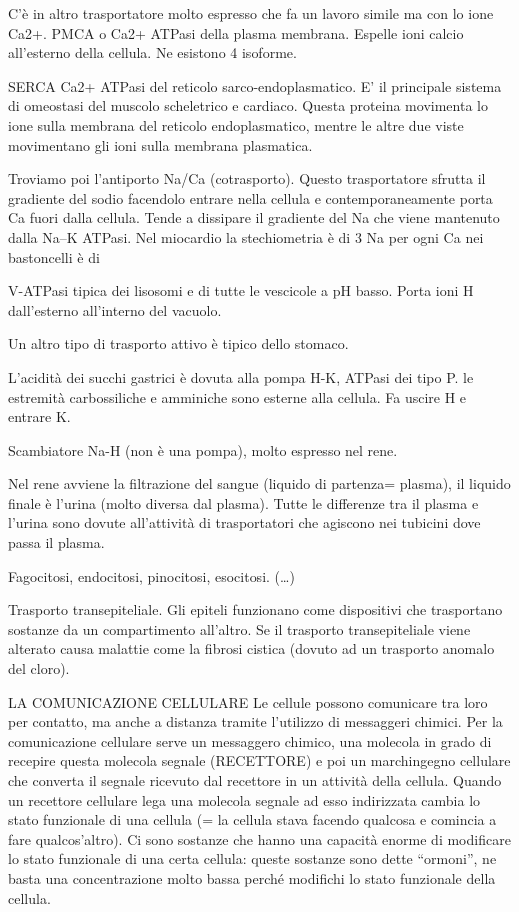 \documentclass[]{article}
\begin{document}
C'è in altro trasportatore molto espresso che fa un lavoro simile ma con
lo ione Ca2+. PMCA o Ca2+ ATPasi della plasma membrana. Espelle ioni
calcio all'esterno della cellula. Ne esistono 4 isoforme.

SERCA Ca2+ ATPasi del reticolo sarco-endoplasmatico. E' il principale
sistema di omeostasi del muscolo scheletrico e cardiaco. Questa proteina
movimenta lo ione sulla membrana del reticolo endoplasmatico, mentre le
altre due viste movimentano gli ioni sulla membrana plasmatica.

Troviamo poi l'antiporto Na/Ca (cotrasporto). Questo trasportatore
sfrutta il gradiente del sodio facendolo entrare nella cellula e
contemporaneamente porta Ca fuori dalla cellula. Tende a dissipare il
gradiente del Na che viene mantenuto dalla Na--K ATPasi. Nel miocardio
la stechiometria è di 3 Na per ogni Ca nei bastoncelli è di

V-ATPasi tipica dei lisosomi e di tutte le vescicole a pH basso. Porta
ioni H dall'esterno all'interno del vacuolo.

Un altro tipo di trasporto attivo è tipico dello stomaco.

L'acidità dei succhi gastrici è dovuta alla pompa H-K, ATPasi dei tipo
P. le estremità carbossiliche e amminiche sono esterne alla cellula. Fa
uscire H e entrare K.

Scambiatore Na-H (non è una pompa), molto espresso nel rene.

Nel rene avviene la filtrazione del sangue (liquido di partenza=
plasma), il liquido finale è l'urina (molto diversa dal plasma). Tutte
le differenze tra il plasma e l'urina sono dovute all'attività di
trasportatori che agiscono nei tubicini dove passa il plasma.

Fagocitosi, endocitosi, pinocitosi, esocitosi. (\ldots{})

Trasporto transepiteliale. Gli epiteli funzionano come dispositivi che
trasportano sostanze da un compartimento all'altro. Se il trasporto
transepiteliale viene alterato causa malattie come la fibrosi cistica
(dovuto ad un trasporto anomalo del cloro).

LA COMUNICAZIONE CELLULARE Le cellule possono comunicare tra loro per
contatto, ma anche a distanza tramite l'utilizzo di messaggeri chimici.
Per la comunicazione cellulare serve un messaggero chimico, una molecola
in grado di recepire questa molecola segnale (RECETTORE) e poi un
marchingegno cellulare che converta il segnale ricevuto dal recettore in
un attività della cellula. Quando un recettore cellulare lega una
molecola segnale ad esso indirizzata cambia lo stato funzionale di una
cellula (= la cellula stava facendo qualcosa e comincia a fare
qualcos'altro). Ci sono sostanze che hanno una capacità enorme di
modificare lo stato funzionale di una certa cellula: queste sostanze
sono dette ``ormoni'', ne basta una concentrazione molto bassa perché
modifichi lo stato funzionale della cellula.
\end{document}
